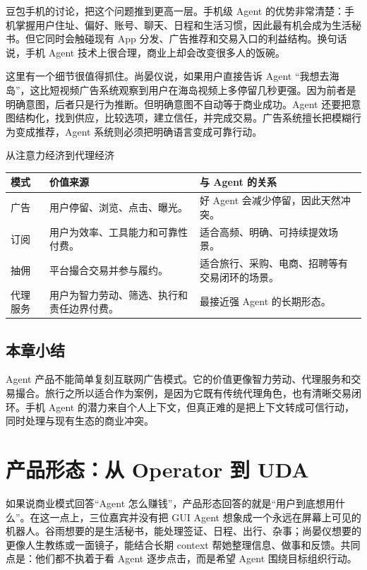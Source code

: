 \documentclass[a4paper]{article}
\begin{document}
豆包手机的讨论，把这个问题推到更高一层。手机级 Agent 的优势非常清楚：手机掌握用户住址、偏好、账号、聊天、日程和生活习惯，因此最有机会成为生活秘书。但它同时会触碰现有 App 分发、广告推荐和交易入口的利益结构。换句话说，手机 Agent 技术上很合理，商业上却会改变很多人的饭碗。

这里有一个细节很值得抓住。尚晏仪说，如果用户直接告诉 Agent “我想去海岛”，这比短视频广告系统观察到用户在海岛视频上多停留几秒更强。因为前者是明确意图，后者只是行为推断。但明确意图不自动等于商业成功。Agent 还要把意图结构化，找到供应，比较选项，建立信任，并完成交易。广告系统擅长把模糊行为变成推荐，Agent 系统则必须把明确语言变成可靠行动。

\begin{knowledgebox}{从注意力经济到代理经济}
\begin{tabularx}{\textwidth}{>{\raggedright\arraybackslash}p{} Y Y}
\toprule
模式 & 价值来源 & 与 Agent 的关系 \\
\midrule
广告 & 用户停留、浏览、点击、曝光。 & 好 Agent 会减少停留，因此天然冲突。 \\
订阅 & 用户为效率、工具能力和可靠性付费。 & 适合高频、明确、可持续提效场景。 \\
抽佣 & 平台撮合交易并参与履约。 & 适合旅行、采购、电商、招聘等有交易闭环的场景。 \\
代理服务 & 用户为智力劳动、筛选、执行和责任边界付费。 & 最接近强 Agent 的长期形态。 \\
\bottomrule
\end{tabularx}
\end{knowledgebox}

\subsection{本章小结}

Agent 产品不能简单复刻互联网广告模式。它的价值更像智力劳动、代理服务和交易撮合。旅行之所以适合作为案例，是因为它既有传统代理角色，也有清晰交易闭环。手机 Agent 的潜力来自个人上下文，但真正难的是把上下文转成可信行动，同时处理与现有生态的商业冲突。

\section{产品形态：从 Operator 到 UDA}

如果说商业模式回答“Agent 怎么赚钱”，产品形态回答的就是“用户到底想用什么”。在这一点上，三位嘉宾并没有把 GUI Agent 想象成一个永远在屏幕上可见的机器人。谷雨想要的是生活秘书，能处理签证、日程、出行、杂事；尚晏仪想要的更像人生教练或一面镜子，能结合长期 context 帮她整理信息、做事和反馈。共同点是：他们都不执着于看 Agent 逐步点击，而是希望 Agent 围绕目标组织行动。
\end{document}
